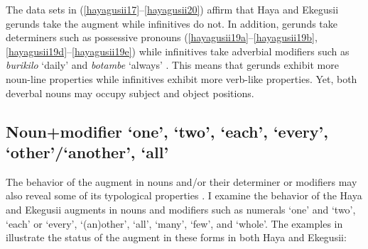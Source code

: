 \documentclass[output=paper]{langscibook}
\begin{document}
The data sets in (\ref{hayagusii17}--\ref{hayagusii20}) affirm that Haya and Ekegusii gerunds take the augment while infinitives do not. In addition, gerunds take determiners such as possessive pronouns (\ref{hayagusii19a}--\ref{hayagusii19b}, \ref{hayagusii19d}--\ref{hayagusii19e}) while infinitives take adverbial modifiers such as \textit{burikilo} ‘daily’  and \textit{botambe} ‘always’ .  This means that gerunds exhibit more noun-line properties while infinitives exhibit more verb-like properties. Yet, both deverbal nouns may occupy subject and object positions.

\subsection{Noun+modifier ‘one’, ‘two’, ‘each’, ‘every’, ‘other’/‘another’, ‘all’}
The behavior of the augment in nouns and/or their determiner or modifiers may also reveal some of its typological properties \citep{blois1970augment}. I examine the behavior of the Haya and Ekegusii augments in nouns and  modifiers such as numerals ‘one’ and ‘two’, ‘each’ or ‘every’, ‘(an)other’, ‘all’, ‘many’, ‘few’, and ‘whole’. The examples in  illustrate the status of the augment in these forms in both Haya and Ekegusii:
\end{document}
